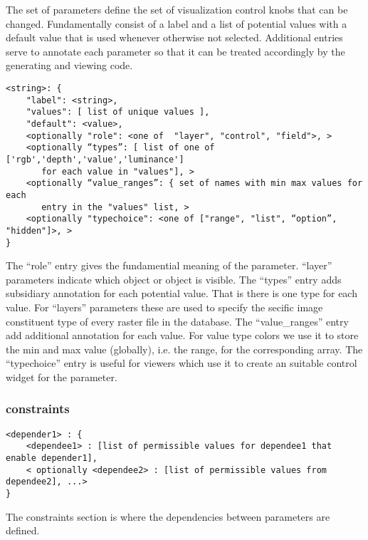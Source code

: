 \documentclass{article}
\begin{document}
The set of parameters define the set of visualization control knobs that can be changed. Fundamentally consist of a label and a list of potential values with a default value that is used whenever otherwise not selected. Additional entries serve to annotate each parameter so that it can be treated accordingly by the generating and viewing code.

\begin{verbatim}
<string>: {
    "label": <string>,
    "values": [ list of unique values ],
    "default": <value>,
    <optionally "role": <one of  "layer", "control", "field">, >
    <optionally “types”: [ list of one of ['rgb','depth','value','luminance']
       for each value in "values"], >
    <optionally “value_ranges”: { set of names with min max values for each
       entry in the "values" list, >
    <optionally "typechoice": <one of ["range", "list", “option”, "hidden"]>, >
}
\end{verbatim}

The ``role'' entry gives the fundamential meaning of the parameter. ``layer'' parameters indicate which object or object is visible.
The ``types'' entry adds subsidiary annotation for each potential value. That is there is one type for each value. For ``layers'' parameters these are used to specify the secific image constituent type of every raster file in the database.
The ``value\_ranges'' entry add additional annotation for each value. For value type colors we use it to store the min and max value (globally), i.e. the range, for the corresponding array.
The ``typechoice'' entry is useful for viewers which use it to create an suitable control widget for the parameter.


\subsubsection{constraints}
\begin{verbatim}
<depender1> : {
    <dependee1> : [list of permissible values for dependee1 that enable depender1],
    < optionally <dependee2> : [list of permissible values from dependee2], ...>
}
\end{verbatim}

The constraints section is where the dependencies between parameters are defined.
\end{document}
